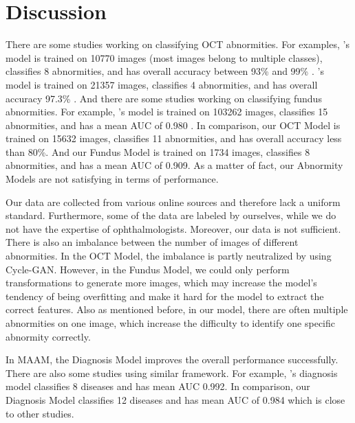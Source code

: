 \documentclass{article}
\begin{document}
	\section{Discussion}
	
	There are some studies working on classifying OCT abnormities.  For examples, \citeauthor{leandro2023oct}'s model is trained on 10770 images (most images belong to multiple classes), classifies 8 abnormities, and has overall accuracy between 93\% and 99\% \autocite{leandro2023oct}. \citeauthor{li2019deep}'s model is trained on 21357 images, classifies 4 abnormities, and has overall accuracy 97.3\% \autocite{li2019deep}.  And there are some studies working on classifying fundus abnormities.  For example,  	\citeauthor{Son2023}'s model is trained on 103262 images, classifies 15 abnormities, and has a mean AUC of 0.980 \autocite{Son2023}. In comparison, our OCT Model is trained on 15632 images, classifies 11 abnormities, and has overall accuracy less than 80\%.  And our Fundus Model is trained on 1734 images, classifies 8 abnormities, and has a mean AUC of 0.909. As a matter of fact, our Abnormity Models are not satisfying in terms of performance.
	
	Our data are collected from various online sources and therefore lack a uniform standard. Furthermore, some of the data are labeled by ourselves, while we do not have the expertise of ophthalmologists. Moreover, our data is not sufficient. There is also an imbalance between the number of images of different abnormities. In the OCT Model, the imbalance is partly neutralized by using Cycle-GAN. However, in the Fundus Model, we could only perform transformations to generate more images, which may increase the model's tendency of being overfitting and make it hard for the model to extract the correct features. Also as mentioned before, in our model, there are often multiple abnormities on one image, which increase the difficulty to identify one specific abnormity correctly. 
	
	\vspace{0.3cm}
	
	In MAAM, the Diagnosis Model improves the overall performance successfully. There are also some studies using similar framework. For example, \citeauthor{Son2023}'s diagnosis model classifies 8 diseases and has mean AUC 0.992\autocite{Son2023}. In comparison, our Diagnosis Model classifies 12 diseases and has mean AUC of 0.984 which is close to other studies.
	
\end{document}
